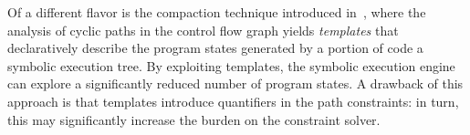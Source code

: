 {%



}

Of a different flavor is the compaction technique introduced in~\cite{SST-ATVA13}, where  the analysis of cyclic paths in the control flow graph yields {\em templates} that declaratively describe the program states generated by a portion of code  a  symbolic execution tree. By exploiting templates, the symbolic execution engine can explore a significantly reduced number of program states. A drawback of this approach is that templates introduce quantifiers in the path constraints: in turn, this may significantly increase the burden on the constraint solver.

